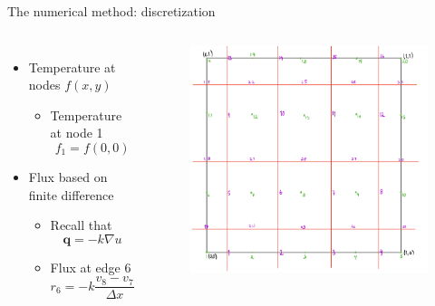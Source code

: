 \documentclass{beamer}
\begin{document}
    \begin{frame}{The numerical method: discretization}
        \begin{columns}
            \begin{itemize}
                \item Temperature at nodes $f(x, y)$
                \begin{itemize}
                    \item Temperature at node 1
                    \begin{equation*}
                        f_1 = f(0, 0)
                    \end{equation*}
                \end{itemize}
                \item Flux based on finite difference
                \begin{itemize}
                    \item Recall that
                    \begin{equation*}
                        \bm{q} = -k \nabla u
                    \end{equation*}
                    \item Flux at edge 6
                    \begin{equation*}
                        r_6 = -k \frac{v_8 - v_7}{\Delta x}
                    \end{equation*}
                \end{itemize} 
            \end{itemize}
            \begin{figure}
                \includegraphics[scale=0.24]{grid.png}
            \end{figure}
        \end{columns}
    \end{frame}
\end{document}
